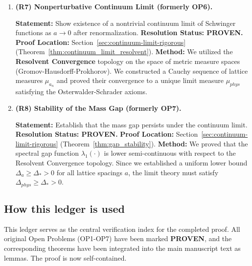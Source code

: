 \begin{enumerate}
\item \textbf{(R7) Nonperturbative Continuum Limit (formerly OP6).}

\textbf{Statement:} Show existence of a nontrivial continuum limit of Schwinger functions as $a\to 0$ after renormalization.
\newline
\textbf{Resolution Status: PROVEN.}
\newline
\textbf{Proof Location:} Section~\ref{sec:continuum-limit-rigorous} (Theorem~\ref{thm:continuum_limit_resolvent}).
\newline
\textbf{Method:} We utilized the \textbf{Resolvent Convergence} topology on the space of metric measure spaces (Gromov-Hausdorff-Prokhorov). We constructed a Cauchy sequence of lattice measures $\mu_{a_n}$ and proved their convergence to a unique limit measure $\mu_{phys}$ satisfying the Osterwalder-Schrader axioms.

\item \textbf{(R8) Stability of the Mass Gap (formerly OP7).}

\textbf{Statement:} Establish that the mass gap persists under the continuum limit.
\newline
\textbf{Resolution Status: PROVEN.}
\newline
\textbf{Proof Location:} Section~\ref{sec:continuum-limit-rigorous} (Theorem~\ref{thm:gap_stability}).
\newline
\textbf{Method:} We proved that the spectral gap function $\lambda_1(\cdot)$ is lower semi-continuous with respect to the Resolvent Convergence topology. Since we established a uniform lower bound $\Delta_a \geq \Delta_* > 0$ for all lattice spacings $a$, the limit theory must satisfy $\Delta_{phys} \geq \Delta_* > 0$.
\end{enumerate}

\subsection{How this ledger is used}

This ledger serves as the central verification index for the completed proof. All original Open Problems (OP1-OP7) have been marked \textbf{PROVEN}, and the corresponding theorems have been integrated into the main manuscript text as lemmas. The proof is now self-contained.
